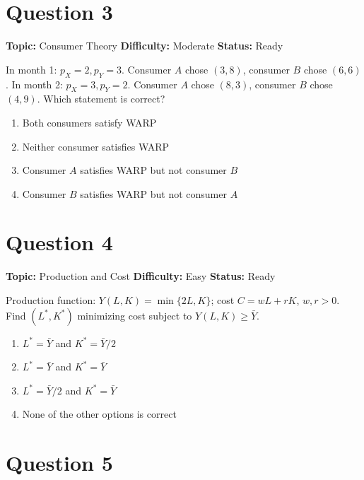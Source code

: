 \documentclass[11pt]{article}
\begin{document}
\newpage

\section*{Question 3}


\noindent\textbf{Topic:} Consumer Theory \quad \textbf{Difficulty:} Moderate \quad \textbf{Status:} Ready



In month 1: $p_X = 2, p_Y = 3$. Consumer $A$ chose $(3,8)$, consumer $B$ chose $(6,6)$.
In month 2: $p_X = 3, p_Y = 2$. Consumer $A$ chose $(8,3)$, consumer $B$ chose $(4,9)$.
Which statement is correct?
\begin{enumerate}[label=(\Alph*)]
\item Both consumers satisfy WARP
\item Neither consumer satisfies WARP
\item Consumer $A$ satisfies WARP but not consumer $B$
\item Consumer $B$ satisfies WARP but not consumer $A$
\end{enumerate}

\newpage

\section*{Question 4}


\noindent\textbf{Topic:} Production and Cost \quad \textbf{Difficulty:} Easy \quad \textbf{Status:} Ready



Production function: $Y(L,K) = \min\{2L, K\}$; cost $C = wL + rK$, $w,r>0$.
Find $(L^*, K^*)$ minimizing cost subject to $Y(L,K) \geq \bar Y$.
\begin{enumerate}[label=(\Alph*)]
\item $L^* = \bar Y$ and $K^* = \bar Y/2$
\item $L^* = \bar Y$ and $K^* = \bar Y$
\item $L^* = \bar Y/2$ and $K^* = \bar Y$
\item None of the other options is correct
\end{enumerate}

\newpage

\section*{Question 5}
\end{document}
